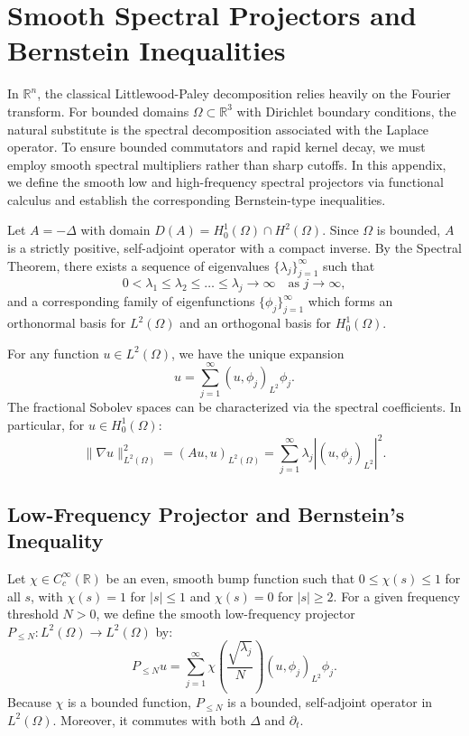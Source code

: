 \documentclass[11pt,letterpaper]{amsart}
\begin{document}
\section{Smooth Spectral Projectors and Bernstein Inequalities}
\label{app:spectral_projectors}

In $\mathbb{R}^n$, the classical Littlewood-Paley decomposition relies heavily on the Fourier transform. For bounded domains $\Omega \subset \mathbb{R}^3$ with Dirichlet boundary conditions, the natural substitute is the spectral decomposition associated with the Laplace operator. To ensure bounded commutators and rapid kernel decay, we must employ smooth spectral multipliers rather than sharp cutoffs. In this appendix, we define the smooth low and high-frequency spectral projectors via functional calculus and establish the corresponding Bernstein-type inequalities.

Let $A = -\Delta$ with domain $D(A) = H^1_0(\Omega) \cap H^2(\Omega)$. Since $\Omega$ is bounded, $A$ is a strictly positive, self-adjoint operator with a compact inverse. By the Spectral Theorem, there exists a sequence of eigenvalues $\{\lambda_j\}_{j=1}^\infty$ such that
\begin{equation}
    0 < \lambda_1 \le \lambda_2 \le \dots \le \lambda_j \to \infty \quad \text{as } j \to \infty,
\end{equation}
and a corresponding family of eigenfunctions $\{\phi_j\}_{j=1}^\infty$ which forms an orthonormal basis for $L^2(\Omega)$ and an orthogonal basis for $H^1_0(\Omega)$.

For any function $u \in L^2(\Omega)$, we have the unique expansion $$u = \sum_{j=1}^\infty (u, \phi_j)_{L^2} \phi_j.$$ The fractional Sobolev spaces can be characterized via the spectral coefficients. In particular, for $u \in H^1_0(\Omega)$:
\begin{equation}\label{eq:H1_norm}
    \|\nabla u\|_{L^2(\Omega)}^2 = (A u, u)_{L^2(\Omega)} = \sum_{j=1}^\infty \lambda_j |(u, \phi_j)_{L^2}|^2.
\end{equation}

\subsection{Low-Frequency Projector and Bernstein's Inequality}
Let $\chi \in C_c^\infty(\mathbb{R})$ be an even, smooth bump function such that $0 \le \chi(s) \le 1$ for all $s$, with $\chi(s) = 1$ for $|s| \le 1$ and $\chi(s) = 0$ for $|s| \ge 2$. For a given frequency threshold $N > 0$, we define the smooth low-frequency projector $P_{\le N}: L^2(\Omega) \to L^2(\Omega)$ by:
\begin{equation}
    P_{\le N} u = \sum_{j=1}^\infty \chi\left(\frac{\sqrt{\lambda_j}}{N}\right) (u, \phi_j)_{L^2} \phi_j.
\end{equation}
Because $\chi$ is a bounded function, $P_{\le N}$ is a bounded, self-adjoint operator in $L^2(\Omega)$. Moreover, it commutes with both $\Delta$ and $\partial_t$.
\end{document}
